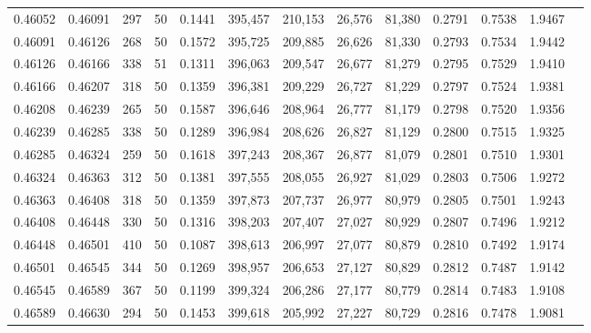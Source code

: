 \begin{tabular}{rrrrrrrrrrrrr}
0.46052 & 0.46091 &   297 &  50 &                                     0.1441 & 395,457 & 210,153 &  26,576 &  81,380 & 0.2791 & 0.7538 & 1.9467 \\
0.46091 & 0.46126 &   268 &  50 &                                     0.1572 & 395,725 & 209,885 &  26,626 &  81,330 & 0.2793 & 0.7534 & 1.9442 \\
0.46126 & 0.46166 &   338 &  51 &                                     0.1311 & 396,063 & 209,547 &  26,677 &  81,279 & 0.2795 & 0.7529 & 1.9410 \\
0.46166 & 0.46207 &   318 &  50 &                                     0.1359 & 396,381 & 209,229 &  26,727 &  81,229 & 0.2797 & 0.7524 & 1.9381 \\
0.46208 & 0.46239 &   265 &  50 &                                     0.1587 & 396,646 & 208,964 &  26,777 &  81,179 & 0.2798 & 0.7520 & 1.9356 \\
0.46239 & 0.46285 &   338 &  50 &                                     0.1289 & 396,984 & 208,626 &  26,827 &  81,129 & 0.2800 & 0.7515 & 1.9325 \\
0.46285 & 0.46324 &   259 &  50 &                                     0.1618 & 397,243 & 208,367 &  26,877 &  81,079 & 0.2801 & 0.7510 & 1.9301 \\
0.46324 & 0.46363 &   312 &  50 &                                     0.1381 & 397,555 & 208,055 &  26,927 &  81,029 & 0.2803 & 0.7506 & 1.9272 \\
0.46363 & 0.46408 &   318 &  50 &                                     0.1359 & 397,873 & 207,737 &  26,977 &  80,979 & 0.2805 & 0.7501 & 1.9243 \\
0.46408 & 0.46448 &   330 &  50 &                                     0.1316 & 398,203 & 207,407 &  27,027 &  80,929 & 0.2807 & 0.7496 & 1.9212 \\
0.46448 & 0.46501 &   410 &  50 &                                     0.1087 & 398,613 & 206,997 &  27,077 &  80,879 & 0.2810 & 0.7492 & 1.9174 \\
0.46501 & 0.46545 &   344 &  50 &                                     0.1269 & 398,957 & 206,653 &  27,127 &  80,829 & 0.2812 & 0.7487 & 1.9142 \\
0.46545 & 0.46589 &   367 &  50 &                                     0.1199 & 399,324 & 206,286 &  27,177 &  80,779 & 0.2814 & 0.7483 & 1.9108 \\
0.46589 & 0.46630 &   294 &  50 &                                     0.1453 & 399,618 & 205,992 &  27,227 &  80,729 & 0.2816 & 0.7478 & 1.9081 \\

\end{tabular}

